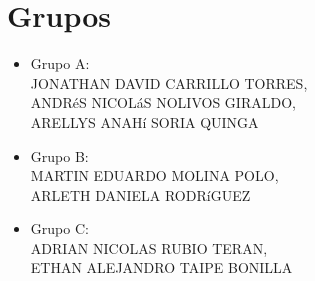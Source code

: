 \documentclass[a4,11pt]{aleph-notas}
\begin{document}
\section{Grupos}

\begin{itemize}
\item 
    Grupo A:\\
    	JONATHAN DAVID CARRILLO TORRES,\\ ANDRéS NICOLáS NOLIVOS GIRALDO,\\ ARELLYS ANAHí SORIA QUINGA 
\item 
    Grupo B:\\
    	MARTIN EDUARDO MOLINA POLO,\\ ARLETH DANIELA RODRíGUEZ
\item 
    Grupo C:\\
    	ADRIAN NICOLAS RUBIO TERAN,\\ ETHAN ALEJANDRO TAIPE BONILLA 
\end{itemize}
\end{document}
